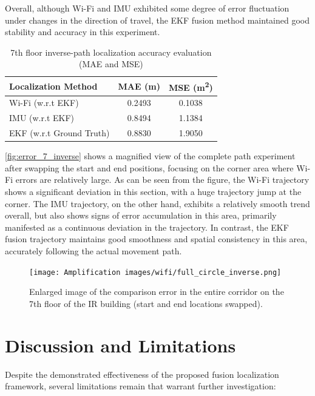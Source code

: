 \documentclass[12pt,a4paper]{article}
\numberwithin{equation}{section}
\begin{document}
Overall, although Wi-Fi and IMU exhibited some degree of error fluctuation under
changes in the direction of travel, the EKF fusion method maintained good
stability and accuracy in this experiment.
\begin{table}[H]
  \centering
  \caption{7th floor inverse-path localization accuracy evaluation (MAE and
    MSE)}
  \label{tab:7th_inverse_accuracy}
  \begin{tabular}{lcc}
    \toprule
    \textbf{Localization Method} & \textbf{MAE (m)} & \textbf{MSE (m\textsuperscript{2})} \\
    \midrule
    Wi-Fi (w.r.t EKF) & 0.2493 & 0.1038 \\
    IMU (w.r.t EKF) & 0.8494 & 1.1384 \\
    EKF (w.r.t Ground Truth) & 0.8830 & 1.9050 \\
    \bottomrule
  \end{tabular}
\end{table}

\autoref{fig:error_7_inverse} shows a magnified view of the complete path
experiment after swapping the start and end positions, focusing on the corner
area where Wi-Fi errors are relatively large. As can be seen from the figure,
the Wi-Fi trajectory shows a significant deviation in this section, with a huge
trajectory jump at the corner. The IMU trajectory, on the other hand, exhibits a
relatively smooth trend overall, but also shows signs of error accumulation in
this area, primarily manifested as a continuous deviation in the trajectory. In
contrast, the EKF fusion trajectory maintains good smoothness and spatial
consistency in this area, accurately following the actual movement path.
\begin{figure}[H]
  \centering
  \texttt{[image: Amplification
    images/wifi/full\_circle\_inverse.png]}
  \caption{Enlarged image of the comparison error in the entire corridor on the
    7th floor of the IR building (start and end locations swapped).}
  \label{fig:error_7_inverse}
\end{figure}

  
\newpage  
\section{Discussion and Limitations}
\label{sec:disc-limit}
Despite the demonstrated effectiveness of the proposed fusion localization
framework, several limitations remain that warrant further investigation:
\end{document}
